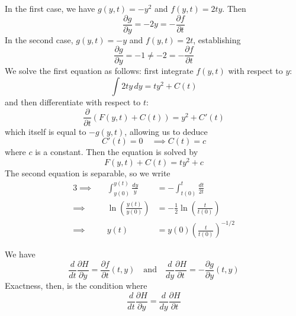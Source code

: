 \documentclass[a4paper]{article}
\begin{document}
In the first case, we have \(g \!\left( y,t \right) = -y^{2}\) and \(f \!\left( y,t \right) = 2ty\). Then
\[
	\frac{\partial g}{\partial y} = -2y = -\frac{\partial f}{\partial t} 
\]
In the second case, \(g \!\left( y,t \right) = -y\) and \(f \!\left( y,t \right) = 2t\), establishing
\[
	\frac{\partial g}{\partial y} = -1 \neq -2 = -\frac{\partial f}{\partial t} 
\]
We solve the first equation as follows: first integrate \(f \!\left( y,t \right) \) with respect to \(y\):
\[
	\int 2ty \, dy = ty^{2}	+ C \!\left( t \right) 
\]
and then differentiate with respect to \(t\):
\[
	\frac{\partial }{\partial t} \!\left( F \!\left( y,t \right) + C \!\left( t \right)  \right) = y^{2} + C'\!\left( t \right) 
\]
which itself is equal to \(-g \!\left( y,t \right) \), allowing us to deduce
\[
	C'\!\left( t \right) = 0 \quad \implies C \!\left( t \right) = c
\]
where \(c\) is a constant. Then the equation is solved by
\[
	F \!\left( y,t \right) + C \!\left( t \right) = ty^{2} + c
\]
The second equation is separable, so we write
\begin{alignat*}{3}
	\implies && \int^{y \!\left( t \right) }_{y \!\left( 0 \right) } \frac{dy}{y}  & = -\int^{t}_{t \!\left( 0 \right) } \frac{dt}{2t}  \\
	\implies && \ln\left( \frac{y \!\left( t \right) }{y \!\left( 0 \right) } \right) & = -\frac{1}{2} \ln\left( \frac{t}{t \!\left( 0 \right) } \right) \\
	\implies && y \!\left( t \right) & = y \!\left( 0 \right) \!\left( \frac{t}{t \!\left( 0 \right) } \right)^{-1/2}
\end{alignat*}

\newpage


We have
\[
	\frac{d }{d t} \frac{\partial H}{\partial y} = \frac{\partial f}{\partial t} \!\left( t,y \right)  \quad \text{and} \quad \frac{d }{d y} \frac{\partial H}{\partial t} = - \frac{\partial g}{\partial y} \!\left( t,y \right) 
\]
Exactness, then, is the condition where
\[
	\frac{d }{d t} \frac{\partial H}{\partial y} = \frac{d }{d y} \frac{\partial H}{\partial t} 
\]
\end{document}
